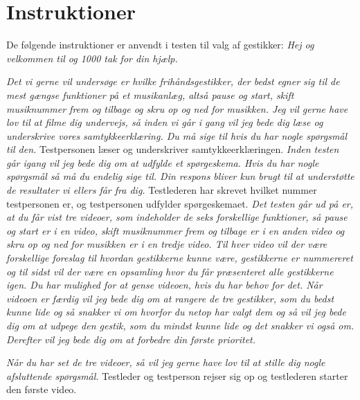 \chapter{Instruktioner}
\label{app:InstruktionerValgAfGestikker}
%
De følgende instruktioner er anvendt i testen til valg af gestikker:\blankline
%
\textit{Hej og velkommen til og 1000 tak for din hjælp.} 

\textit{Det vi gerne vil undersøge er hvilke frihåndsgestikker, der bedst egner sig til de mest gængse funktioner på et musikanlæg, altså pause og start, skift musiknummer frem og tilbage og skru op og ned for musikken. Jeg vil gerne have lov til at filme dig undervejs, så inden vi går i gang vil jeg bede dig læse og underskrive vores samtykkeerklæring. Du må sige til hvis du har nogle spørgsmål til den.}\blankline
%
Testpersonen læser og underskriver samtykkeerklæringen. \blankline
%  
\textit{Inden testen går igang vil jeg bede dig om at udfylde et spørgeskema. Hvis du har nogle spørgsmål så må du endelig sige til. Din respons bliver kun brugt til at understøtte de resultater vi ellers får fra dig.} \blankline
%
Testlederen har skrevet hvilket nummer testpersonen er, og testpersonen udfylder spørgeskemaet.\blankline
%  
\textit{Det testen går ud på er, at du får vist tre videoer, som indeholder de seks forskellige funktioner, så pause og start er i en video, skift musiknummer frem og tilbage er i en anden video og skru op og ned for musikken er i en tredje video. Til hver video vil der være forskellige foreslag til hvordan gestikkerne kunne være, gestikkerne er nummereret og til sidst vil der være en opsamling hvor du får præsenteret alle gestikkerne igen. Du har mulighed for at gense videoen, hvis du har behov for det. Når videoen er færdig vil jeg bede dig om at rangere de tre gestikker, som du bedst kunne lide og så snakker vi om hvorfor du netop har valgt dem og så vil jeg bede dig om at udpege den gestik, som du mindst kunne lide og det snakker vi også om. Derefter vil jeg bede dig om at forbedre din første prioritet.} 

\textit{Når du har set de tre videoer, så vil jeg gerne have lov til at stille dig nogle afsluttende spørgsmål.}\blankline
%
Testleder og testperson rejser sig op og testlederen starter den første video. 
% 
